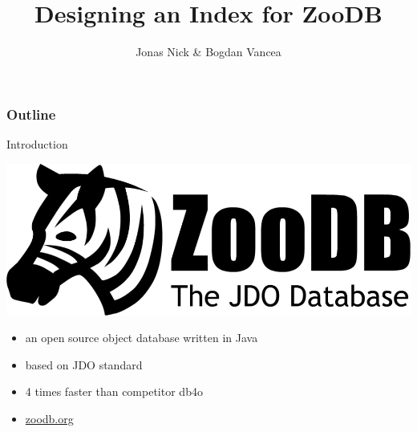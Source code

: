 \documentclass{beamer}
\title{Designing an Index for ZooDB}
\author{Jonas Nick \& Bogdan Vancea}
\begin{document}
  \frame{\titlepage}
  \begin{frame}
    \frametitle{Outline}
    \tableofcontents[hideallsubsections]
  \end{frame}

  \begin{section}{Introduction}
    \begin{frame}
      \vspace{-4em}
      \hspace{-2em}
      \includegraphics[scale=0.1]{images/zoodb_logo.png}
      \vspace{3em}
      \hspace{2em}
      \begin{itemize}
        \item an open source object database written in Java
        \pause
        \item based on JDO standard
        \pause
        \item 4 times faster than competitor db4o
        \pause
        \item \url{zoodb.org}
      \end{itemize}


\end{frame}
\end{section}
\end{document}

